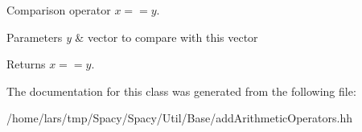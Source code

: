 Comparison operator $ x==y$. 


\begin{DoxyParams}{Parameters}
{\em y} & vector to compare with this vector \\
\hline
\end{DoxyParams}
\begin{DoxyReturn}{Returns}
$ x==y$. 
\end{DoxyReturn}


The documentation for this class was generated from the following file\+:\begin{DoxyCompactItemize}
\item 
/home/lars/tmp/\+Spacy/\+Spacy/\+Util/\+Base/add\+Arithmetic\+Operators.\+hh\end{DoxyCompactItemize}
